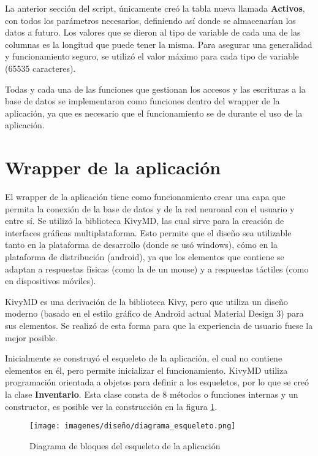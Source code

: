 \par
La anterior sección del script, únicamente creó la tabla nueva llamada \textbf{Activos}, con todos los parámetros necesarios, definiendo así donde se almacenarían los datos a futuro. Los valores que se dieron al tipo de variable de cada una de las columnas es la longitud que puede tener la misma. Para asegurar una generalidad y funcionamiento seguro, se utilizó el valor máximo para cada tipo de variable (65535 caracteres).
\par
Todas y cada una de las funciones que gestionan los accesos y las escrituras a la base de datos se implementaron como funciones dentro del wrapper de la aplicación, ya que es necesario que el funcionamiento se de durante el uso de la aplicación. 


\section{Wrapper de la aplicación}
 El wrapper de la aplicación tiene como funcionamiento crear una capa que permita la conexión de la base de datos y de la red neuronal con el usuario y entre sí. Se utilizó la biblioteca KivyMD, las cual sirve para la creación de interfaces gráficas multiplataforma. Esto permite que el diseño sea utilizable tanto en la plataforma de desarrollo (donde se usó windows), cómo en la plataforma de distribución (android), ya que los elementos que contiene se adaptan a respuestas físicas (como la de un mouse) y a respuestas táctiles (como en dispositivos móviles).
 \par
 KivyMD es una derivación de la biblioteca Kivy, pero que utiliza un diseño moderno (basado en el estilo gráfico de Android actual Material Design 3) para sus elementos. Se realizó de esta forma para que la experiencia de usuario fuese la mejor posible. 
\par
 Inicialmente se construyó el esqueleto de la aplicación, el cual no contiene elementos en él, pero permite inicializar el funcionamiento. KivyMD utiliza programación orientada a objetos para definir a los esqueletos, por lo que se creó la clase \textbf{Inventario}. Esta clase consta de 8 métodos o funciones internas y un constructor, es posible ver la construcción en la figura \ref{skeleton}.
 \begin{figure}[h!]
    \centering
    \texttt{[image: imagenes/diseño/diagrama\_esqueleto.png]}
    \caption{Diagrama de bloques del esqueleto de la aplicación}
    \label{skeleton}
\end{figure}
